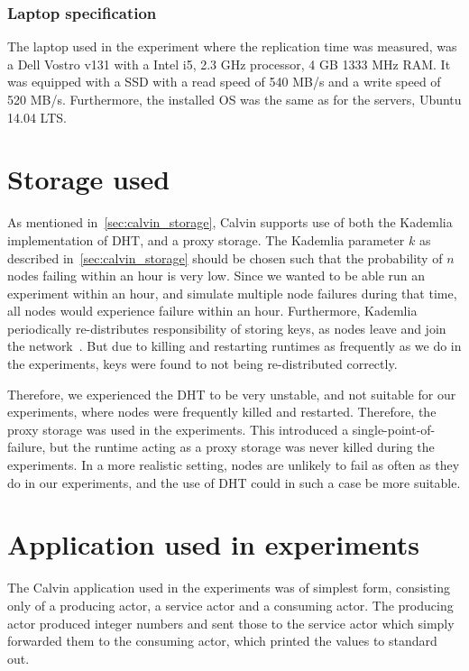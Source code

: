 \documentclass{cslthse-msc}
\begin{document}
\subsubsection{Laptop specification} \label{sec:laptop_spec}
The laptop used in the experiment where the replication time was measured, was a Dell Vostro v131 with a Intel i5, 2.3 GHz processor, 4 GB 1333 MHz RAM. It was equipped with a SSD with a read speed of 540 MB/s and a write speed of 520 MB/s. Furthermore, the installed OS was the same as for the servers, Ubuntu 14.04 LTS.


\section{Storage used} \label{sec:eval_storage}
As mentioned in~\cref{sec:calvin_storage}, Calvin supports use of both the Kademlia implementation of DHT, and a proxy storage. The Kademlia parameter $k$ as described in~\cref{sec:calvin_storage} should be chosen such that the probability of $n$ nodes failing within an hour is very low. Since we wanted to be able run an experiment within an hour, and simulate multiple node failures during that time, all nodes would experience failure within an hour. Furthermore, Kademlia periodically re-distributes responsibility of storing keys, as nodes leave and join the network~\cite{kademlia}. But due to killing and restarting runtimes as frequently as we do in the experiments, keys were found to not being re-distributed correctly. 

Therefore, we experienced the DHT to be very unstable, and not suitable for our experiments, where nodes were frequently killed and restarted. Therefore, the proxy storage was used in the experiments. This introduced a single-point-of-failure, but the runtime acting as a proxy storage was never killed during the experiments. In a more realistic setting, nodes are unlikely to fail as often as they do in our experiments, and the use of DHT could in such a case be more suitable.

\section{Application used in experiments} \label{sec:eval_application}
The Calvin application used in the experiments was of simplest form, consisting only of a producing actor, a service actor and a consuming actor. The producing actor produced integer numbers and sent those to the service actor which simply forwarded them to the consuming actor, which printed the values to standard out. 
\end{document}
